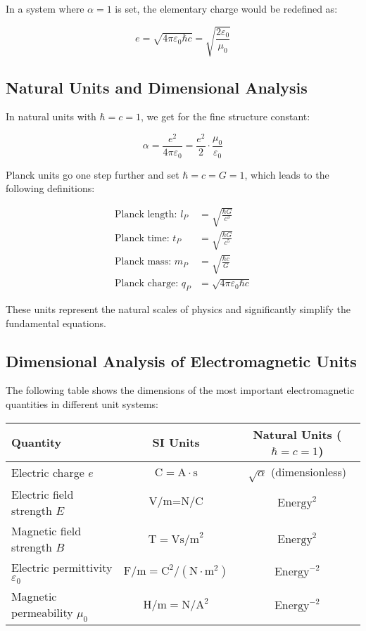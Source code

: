 \documentclass{article}
\begin{document}
In a system where $\alpha = 1$ is set, the elementary charge would be redefined as:

\begin{equation}
	e = \sqrt{4\pi\varepsilon_0\hbar c} = \sqrt{\frac{2\varepsilon_0}{\mu_0}}
\end{equation}

\subsection{Natural Units and Dimensional Analysis}

In natural units with $\hbar = c = 1$, we get for the fine structure constant:

\begin{equation}
	\alpha = \frac{e^2}{4\pi\varepsilon_0} = \frac{e^2}{2} \cdot \frac{\mu_0}{\varepsilon_0}
\end{equation}

Planck units go one step further and set $\hbar = c = G = 1$, which leads to the following definitions:

\begin{align}
	\text{Planck length: } l_P &= \sqrt{\frac{\hbar G}{c^3}} \\
	\text{Planck time: } t_P &= \sqrt{\frac{\hbar G}{c^5}} \\
	\text{Planck mass: } m_P &= \sqrt{\frac{\hbar c}{G}} \\
	\text{Planck charge: } q_P &= \sqrt{4\pi\varepsilon_0\hbar c}
\end{align}

These units represent the natural scales of physics and significantly simplify the fundamental equations.

\subsection{Dimensional Analysis of Electromagnetic Units}

The following table shows the dimensions of the most important electromagnetic quantities in different unit systems:

\begin{center}
	\begin{tabular}{|l|c|c|}
		\hline
		\textbf{Quantity} & \textbf{SI Units} & \textbf{Natural Units} ($\hbar = c = 1$) \\
		\hline
		Electric charge $e$ & $\text{C} = \text{A} \cdot \text{s}$ & $\sqrt{\alpha}$ (dimensionless) \\
		Electric field strength $E$ & $\text{V/m} = \text{N/C}$ & $\text{Energy}^2$ \\
		Magnetic field strength $B$ & $\text{T} = \text{Vs/m}^2$ & $\text{Energy}^2$ \\
		Electric permittivity $\varepsilon_0$ & $\text{F/m} = \text{C}^2/(\text{N} \cdot \text{m}^2)$ & $\text{Energy}^{-2}$ \\
		Magnetic permeability $\mu_0$ & $\text{H/m} = \text{N}/\text{A}^2$ & $\text{Energy}^{-2}$ \\
		\hline
	\end{tabular}
\end{center}
\end{document}
